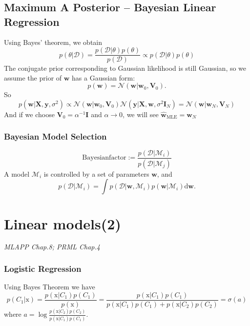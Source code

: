 \documentclass{article}
\newcommand{\norm}{\mathcal N}
\newcommand{\mbf}{\mathbf}
\newcommand{\mrm}{\mathrm}
\newcommand{\mcal}{\mathcal}
\begin{document}
\subsection*{Maximum A Posterior -- Bayesian Linear Regression}
Using Bayes' theorem, we obtain
\begin{equation}
    p(\theta|\mcal D) = \frac{p(\mcal D|\theta)p(\theta)}{p(\mcal D)} \propto p(\mcal D|\theta)p(\theta)
\end{equation}
The conjugate prior corresponding to Gaussian likelihood is still Gaussian, so we assume the prior of $\mbf w$ has a Gaussian form:
\begin{equation}
    p(\mbf w) = \norm (\mbf w|\mbf w_0,\mbf V_0).
\end{equation}
So 
\begin{equation}
    p(\mbf w|\mbf X,\mbf y, \sigma^2)\propto \norm(\mbf w|\mbf w_0,\mbf V_0)\norm(\mbf y|\mbf X,\mbf w,\sigma^2\mbf I_N) = \norm(\mbf w|\mbf w_N,\mbf V_N)
\end{equation}
And if we choose $\mbf V_0=\alpha^{-1}\mbf I$ and $\alpha\rightarrow 0$, we will see $\hat{\mbf w}_{\mrm{MLE}} = \mbf w_N$

\subsubsection*{Bayesian Model Selection}
\begin{equation}
    \mrm{Bayesian factor}:=\frac{p(\mcal D|\mcal M_i)}{p(\mcal D|\mcal M_j)}
\end{equation}
A model $\mcal M_i$ is controlled by a set of parameters $\mbf w$, and 
\begin{equation}
    p(\mcal D|\mcal M_i) = \int p(\mcal D|\mbf w,\mcal M_i)p(\mbf w|\mcal M_i)\mrm d\mbf w.
\end{equation}

\section{Linear models(2)}
\emph{MLAPP Chap.8; PRML Chap.4}
\subsubsection*{Logistic Regression}
Using Bayes Theorem we have 
\begin{equation}
    p(C_1|\mrm x) = \frac{p(\mrm x|C_1)p(C_1)}{p(\mrm x)} = \frac{p(\mrm x|C_1)p(C_1)}{p(\mrm x|C_1)p(C_1)+p(\mrm x|C_2)p(C_2)}=\sigma(a)
\end{equation}
where $a =\log\frac{p(\mrm x|C_2)p(C_2)}{p(\mrm x|C_1)p(C_1)}$.
\end{document}
